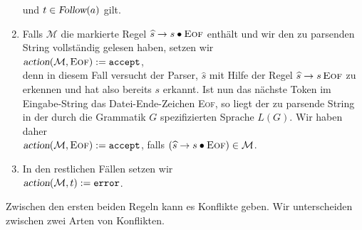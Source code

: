 \begin{enumerate}
      und $t \in \textsl{Follow}(a)$ gilt.
\item Falls $\mathcal{M}$ die markierte Regel $\widehat{s} \rightarrow s \bullet \textsc{Eof}$ enth\"alt und
      wir den zu parsenden String vollst\"andig gelesen haben, setzen wir
      \\[0.2cm]
      \hspace*{1.3cm}
      $\textsl{action}(\mathcal{M},\textsc{Eof}) := \texttt{accept}$,
      \\[0.2cm]
      denn in diesem Fall versucht der Parser, $\widehat{s}$ mit Hilfe der Regel $\widehat{s} \rightarrow s\,\textsc{Eof}$
      zu erkennen und hat also bereits $s$ erkannt. Ist nun das n\"achste Token im Eingabe-String 
      das Datei-Ende-Zeichen \textsc{Eof}, 
      so liegt der zu parsende String in der durch die Grammatik $G$ spezifizierten Sprache
      $L(G)$.  Wir haben daher
      \\[0.2cm]
      \hspace*{1.3cm}
      $\textsl{action}(\mathcal{M},\textsc{Eof}) := \texttt{accept}$,
      \quad falls $(\widehat{s} \rightarrow s\bullet\textsc{Eof}) \in \mathcal{M}$.
\item In den restlichen F\"allen setzen wir
      \\[0.2cm]
      \hspace*{1.3cm}
      $\textsl{action}(\mathcal{M},t) := \texttt{error}$.
\end{enumerate}
Zwischen den ersten beiden Regeln kann es Konflikte geben.  
Wir unterscheiden zwischen zwei Arten von Konflikten.
